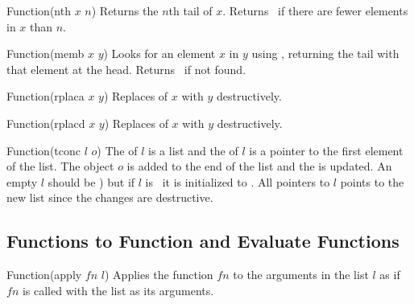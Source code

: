 \begin{defun}{Function}{(nth $x$ $n$)}
  Returns the $n$th tail of $x$. Returns \NIL\ if there are fewer
  elements in $x$ than $n$.

  \begin{examples}
  \end{examples}
\end{defun}

\begin{defun}{Function}{(memb $x$ $y$)}
  Looks for an element $x$ in $y$ using , returning the tail
  with that element at the head. Returns \NIL\ if not found.

  \begin{examples}
  \end{examples}

\end{defun}


\begin{defun}{Function}{(rplaca $x$ $y$)}
  Replaces  of $x$ with $y$ destructively.
\end{defun}

\begin{defun}{Function}{(rplacd $x$ $y$)}
  Replaces  of $x$ with $y$ destructively.
\end{defun}

\begin{defun}{Function}{(tconc $l$ $o$)}
  The  of $l$ is a list and the  of $l$ is a
  pointer to the first element of the list.  The object $o$ is added
  to the end of the list and the  is updated.  An empty $l$
  should be ) but if $l$ is \NIL\ it is initialized to
  .  All pointers to $l$ points to the new list since
  the changes are destructive.
\end{defun}

\subsection{Functions to Function and Evaluate Functions}

\begin{defun}{Function}{(apply $fn$ $l$)}
  Applies the function $fn$ to the arguments in the list $l$ as if
  $fn$ is called with the list as its arguments.

\end{defun}

